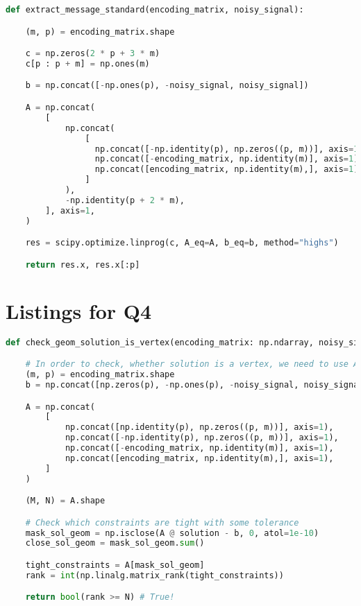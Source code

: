 \documentclass{article}
\begin{document}
\begin{lstlisting}[language=Python, caption={Message decryption based on solution of LOP in standard form. The output is tuple of solution of the problem, and decrypted message itself}, label={lst:std}]
  def extract_message_standard(encoding_matrix, noisy_signal):

    (m, p) = encoding_matrix.shape

    c = np.zeros(2 * p + 3 * m)
    c[p : p + m] = np.ones(m)

    b = np.concat([-np.ones(p), -noisy_signal, noisy_signal])

    A = np.concat(
        [
            np.concat(
                [
                  np.concat([-np.identity(p), np.zeros((p, m))], axis=1),
                  np.concat([-encoding_matrix, np.identity(m)], axis=1),
                  np.concat([encoding_matrix, np.identity(m),], axis=1),
                ]
            ),
            -np.identity(p + 2 * m),
        ], axis=1,
    )

    res = scipy.optimize.linprog(c, A_eq=A, b_eq=b, method="highs")

    return res.x, res.x[:p]
\end{lstlisting}




\section{Listings for Q4}


\begin{lstlisting}[language=Python, caption={Determining number of tight linear independent constraints for solution of linear problem in geometric form to ccheck whetther it it is a vertex of corresponding polyhedron}, label={lst:vertex}]
  def check_geom_solution_is_vertex(encoding_matrix: np.ndarray, noisy_signal: np.ndarray, solution: np.ndarray) -> bool:

    # In order to check, whether solution is a vertex, we need to use A and b from geometric form problem:
    (m, p) = encoding_matrix.shape
    b = np.concat([np.zeros(p), -np.ones(p), -noisy_signal, noisy_signal])

    A = np.concat(
        [
            np.concat([np.identity(p), np.zeros((p, m))], axis=1),
            np.concat([-np.identity(p), np.zeros((p, m))], axis=1),
            np.concat([-encoding_matrix, np.identity(m)], axis=1),
            np.concat([encoding_matrix, np.identity(m),], axis=1),
        ]
    )

    (M, N) = A.shape

    # Check which constraints are tight with some tolerance
    mask_sol_geom = np.isclose(A @ solution - b, 0, atol=1e-10)
    close_sol_geom = mask_sol_geom.sum()

    tight_constraints = A[mask_sol_geom]
    rank = int(np.linalg.matrix_rank(tight_constraints))

    return bool(rank >= N) # True!
\end{lstlisting}
\end{document}
